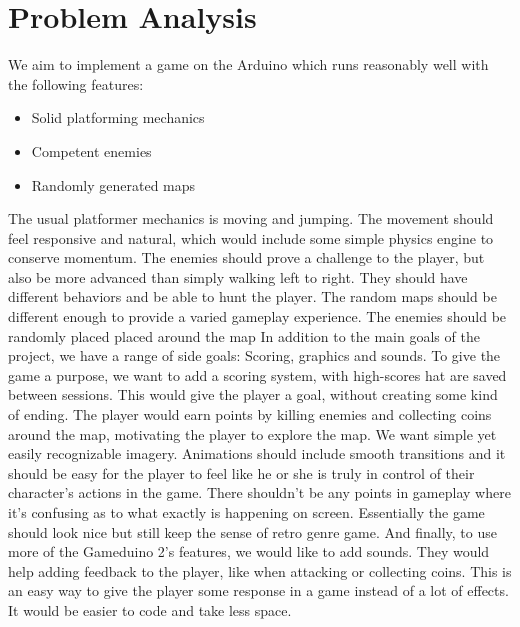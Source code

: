 
\chapter{Problem Analysis}
We aim to implement a game on the Arduino which runs reasonably well with the following features:
\begin{itemize}
\item Solid platforming mechanics
\item Competent enemies
\item Randomly generated maps
\end{itemize}
The usual platformer mechanics is moving and jumping. The movement should feel responsive and natural, which would include some simple physics engine to conserve momentum. The enemies should prove a challenge to the player, but also be more advanced than simply walking left to right. They should have different behaviors and be able to hunt the player. The random maps should be different enough to provide a varied gameplay experience. The enemies should be randomly placed placed around the map
\newline
In addition to the main goals of the project, we have a range of side goals: Scoring, graphics and sounds.
\newline
To give the game a purpose, we want to add a scoring system, with high-scores hat are saved between sessions. This would give the player a goal, without creating some kind of ending. The player would earn points by killing enemies and collecting coins around the map, motivating the player to explore the map.
\newline
We want simple yet easily recognizable imagery. Animations should include smooth transitions and it should be easy for the player to feel like he or she is truly in control of their character's actions in the game. There shouldn't be any points in gameplay where it's confusing as to what exactly is happening on screen. Essentially the game should look nice but still keep the sense of retro genre game.
\newline
And finally, to use more of the Gameduino 2's features, we would like to add sounds. They would help adding feedback to the player, like when attacking or collecting coins. This is an easy way to give the player some response in a game instead of a lot of effects. It would be easier to code and take less space.
